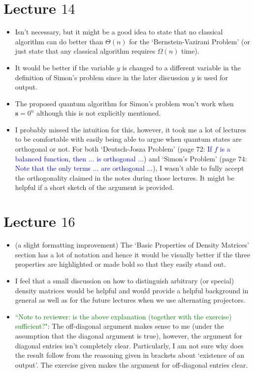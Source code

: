 \documentclass[11pt]{article}
\begin{document}
\section{Lecture $14$}
\begin{itemize}
    \item Isn't necessary, but it might be a good idea to state that no classical algorithm can do better than $\Theta(n)$ for the `Bernstein-Vazirani Problem' (or just state that any classical algorithm requires $\Omega(n)$ time).
    \item It would be better if the variable $y$ is changed to a different variable in the definition of Simon's problem since in the later discussion $y$ is used for output.
    \item The proposed quantum algorithm for Simon's problem won't work when $\mathbf{s} = 0^n$ although this is not explicitly mentioned.
    \item I probably missed the intuition for this, however, it took me a lot of lectures to be comfortable with easily being able to argue when quantum states are orthogonal or not. For both `Deutsch-Josza Problem' (page $72$: \textcolor{blue}{If $f$ is a balanced function, then $\ldots$ is orthogonal $\ldots$}) and `Simon's Problem' (page $74$: \textcolor{blue}{Note that the only terms $\ldots$ are orthogonal $\ldots$}), I wasn't able to fully accept the orthogonality claimed in the notes during those lectures. It might be helpful if a short sketch of the argument is provided.
\end{itemize}

\section{Lecture $16$}
\begin{itemize}
    \item (a slight formatting improvement) The `Basic Properties of Density Matrices' section has a lot of notation and hence it would be visually better if the three properties are highlighted or made bold so that they easily stand out.
    \item I feel that a small discussion on how to distinguish arbitrary (or special) density matrices would be helpful and would provide a helpful background in general as well as for the future lectures when we use alternating projectors. 
    \item \textcolor{green}{``Note to reviewer: is the above explanation (together with the exercise) sufficient?"}: The off-diagonal argument makes sense to me (under the assumption that the diagonal argument is true), however, the argument for diagonal entries isn't completely clear. Particularly, I am not sure why does the result follow from the reasoning given in brackets about `existence of an output'. The exercise given makes the argument for off-diagonal entries clear.
\end{itemize}
\end{document}
